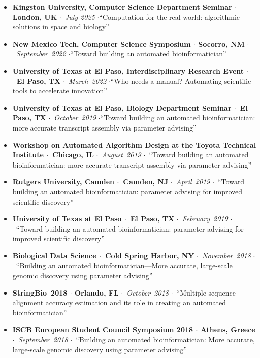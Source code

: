 \documentclass[10pt,letterpaper]{article}
\newcommand{\bigdot}{$\cdot$\xspace}
\begin{document}
\begin{itemize}%
  \item \textbf{Kingston University, Computer Science Department Seminar \bigdot London, UK} \bigdot~\textit{July 2025} \bigdot ``Computation for the real world: algorithmic solutions in space and biology''
  \item \textbf{New Mexico Tech, Computer Science Symposium \bigdot Socorro, NM} \bigdot~\textit{September~2022} \bigdot ``Toward building an automated bioinformatician''
  \item \textbf{University of Texas at El Paso, Interdisciplinary Research Event \bigdot~El Paso, TX} \bigdot~\textit{March~2022} \bigdot ``Who needs a manual? Automating scientific tools to accelerate innovation''
  \item \textbf{University of Texas at El Paso, Biology Department Seminar \bigdot~El Paso, TX} \bigdot~\textit{October~2019} \bigdot ``Toward building an automated bioinformatician: more accurate transcript assembly via parameter advising''
  \item \textbf{Workshop on Automated Algorithm Design at the Toyota Technical Institute \bigdot~Chicago, IL} \bigdot~\textit{August~2019} \bigdot~``Toward building an automated bioinformatician: more accurate transcript assembly via parameter advising''
  \item \textbf{Rutgers University, Camden \bigdot~Camden, NJ} \bigdot~\textit{April~2019} \bigdot~``Toward building an automated bioinformatician: 
parameter advising for improved scientific discovery''
  \item \textbf{University of Texas at El Paso \bigdot~El Paso, TX} \bigdot~\textit{February~2019} \bigdot~``Toward building an automated bioinformatician: 
parameter advising for improved scientific discovery''
  \item \textbf{Biological Data Science \bigdot~Cold Spring Harbor, NY} \bigdot~\textit{November~2018} \bigdot~``Building an automated bioinformatician---More accurate, large-scale genomic discovery using parameter advising'' 
   \item \textbf{StringBio~2018 \bigdot Orlando, FL} \bigdot~\textit{October~2018} \bigdot~``Multiple sequence alignment accuracy estimation and its role in creating an automated bioinformatician'' 
   \item \textbf{ISCB European Student Council Symposium 2018 \bigdot Athens, Greece} \bigdot~\textit{September~2018} \bigdot~``Building an automated bioinformatician: More accurate, large-scale genomic discovery using parameter advising''

\end{itemize}
\end{document}
